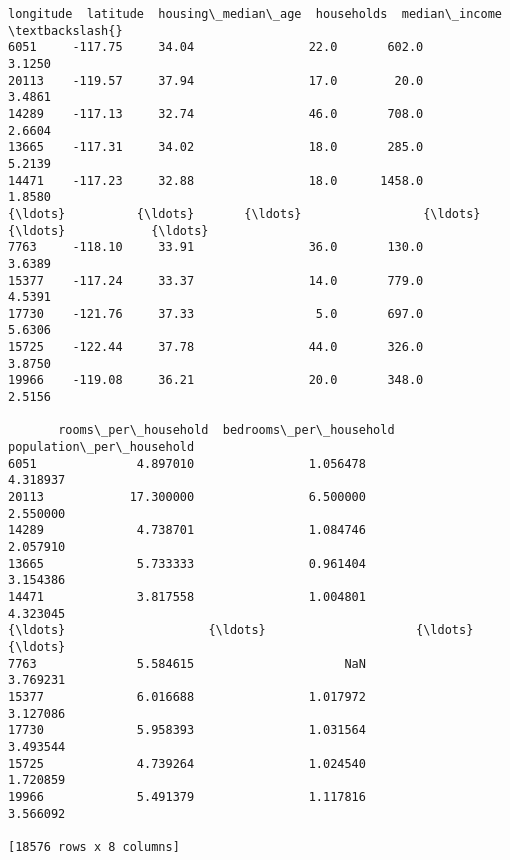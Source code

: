 \documentclass[11pt]{article}
\makeatletter
\newcommand{\boxspacing}{\kern\kvtcb@left@rule\kern\kvtcb@boxsep}
\newcommand{\prompt}[4]{
        {\ttfamily\llap{{\color{#2}[#3]:\hspace{3pt}#4}}\vspace{-\baselineskip}}
    }
\makeatother
\begin{document}
            \begin{tcolorbox}[breakable, size=fbox, boxrule=.5pt, pad at break*=1mm, opacityfill=0]
\prompt{Out}{outcolor}{50}{\boxspacing}
\begin{Verbatim}[commandchars=\\\{\}]
       longitude  latitude  housing\_median\_age  households  median\_income  \textbackslash{}
6051     -117.75     34.04                22.0       602.0         3.1250
20113    -119.57     37.94                17.0        20.0         3.4861
14289    -117.13     32.74                46.0       708.0         2.6604
13665    -117.31     34.02                18.0       285.0         5.2139
14471    -117.23     32.88                18.0      1458.0         1.8580
{\ldots}          {\ldots}       {\ldots}                 {\ldots}         {\ldots}            {\ldots}
7763     -118.10     33.91                36.0       130.0         3.6389
15377    -117.24     33.37                14.0       779.0         4.5391
17730    -121.76     37.33                 5.0       697.0         5.6306
15725    -122.44     37.78                44.0       326.0         3.8750
19966    -119.08     36.21                20.0       348.0         2.5156

       rooms\_per\_household  bedrooms\_per\_household  population\_per\_household
6051              4.897010                1.056478                  4.318937
20113            17.300000                6.500000                  2.550000
14289             4.738701                1.084746                  2.057910
13665             5.733333                0.961404                  3.154386
14471             3.817558                1.004801                  4.323045
{\ldots}                    {\ldots}                     {\ldots}                       {\ldots}
7763              5.584615                     NaN                  3.769231
15377             6.016688                1.017972                  3.127086
17730             5.958393                1.031564                  3.493544
15725             4.739264                1.024540                  1.720859
19966             5.491379                1.117816                  3.566092

[18576 rows x 8 columns]
\end{Verbatim}
\end{tcolorbox}
        
\end{document}
